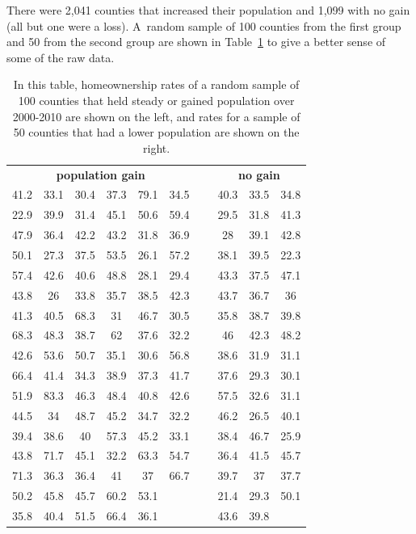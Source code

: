 There were 2,041 counties that increased their population and 1,099 with no gain (all but one were a loss). A~random sample of 100 counties from the first group and 50 from the second group are shown in Table~\ref{countyIncomeSplitByPopGainTable} to give a better sense of some of the raw data.
\begin{table}
\centering\small
\begin{tabular}{ ccc ccc c ccc }
\multicolumn{6}{c}{\bf population gain} && \multicolumn{3}{c}{\bf no gain} \\ 
  \cline{1-6} \cline{8-10}
41.2 & 33.1 & 30.4 & 37.3 & 79.1 & 34.5 &\hspace{5mm}\ & 40.3 & 33.5 & 34.8 \\
22.9 & 39.9 & 31.4 & 45.1 & 50.6 & 59.4 && 29.5 & 31.8 & 41.3 \\
47.9 & 36.4 & 42.2 & 43.2 & 31.8 & 36.9 && 28 & 39.1 & 42.8 \\
50.1 & 27.3 & 37.5 & 53.5 & 26.1 & 57.2 && 38.1 & 39.5 & 22.3 \\
57.4 & 42.6 & 40.6 & 48.8 & 28.1 & 29.4 && 43.3 & 37.5 & 47.1 \\
43.8 & 26 & 33.8 & 35.7 & 38.5 & 42.3 && 43.7 & 36.7 & 36 \\
41.3 & 40.5 & 68.3 & 31 & 46.7 & 30.5 && 35.8 & 38.7 & 39.8 \\
68.3 & 48.3 & 38.7 & 62 & 37.6 & 32.2 && 46 & 42.3 & 48.2 \\
42.6 & 53.6 & 50.7 & 35.1 & 30.6 & 56.8 && 38.6 & 31.9 & 31.1 \\
66.4 & 41.4 & 34.3 & 38.9 & 37.3 & 41.7 && 37.6 & 29.3 & 30.1 \\
51.9 & 83.3 & 46.3 & 48.4 & 40.8 & 42.6 && 57.5 & 32.6 & 31.1 \\
44.5 & 34 & 48.7 & 45.2 & 34.7 & 32.2 && 46.2 & 26.5 & 40.1 \\
39.4 & 38.6 & 40 & 57.3 & 45.2 & 33.1 && 38.4 & 46.7 & 25.9 \\
43.8 & 71.7 & 45.1 & 32.2 & 63.3 & 54.7 && 36.4 & 41.5 & 45.7 \\
71.3 & 36.3 & 36.4 & 41 & 37 & 66.7 && 39.7 & 37 & 37.7 \\
50.2 & 45.8 & 45.7 & 60.2 & 53.1 &  && 21.4 & 29.3 & 50.1 \\
35.8 & 40.4 & 51.5 & 66.4 & 36.1 &  && 43.6 & 39.8 &  \\
\cline{1-6} \cline{8-10}
\end{tabular}
\caption{In this table, homeownership rates of a random sample of 100 counties that held steady or gained population over 2000-2010 are shown on the left, and rates for a sample of 50 counties that had a lower population are shown on the right.}
\label{countyIncomeSplitByPopGainTable}
\end{table}

